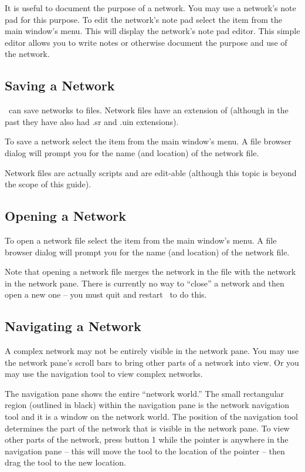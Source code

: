 It is useful to document the purpose of a network.  You may use a network's
note pad for this purpose.  To edit the network's note pad select the
 item from the main window's  menu.  This
will display the network's note pad editor.  This simple editor allows you
to write notes or otherwise document the purpose and use of the network.


\subsection{Saving a Network}
\label{sec:savenet}

\sr\ can save networks to files.  Network files have an extension of
 (although in the past they have also had .sr and .uin
extensions).  

To save a network select the  item from the main window's
 menu.  A file browser dialog will prompt you for the
name (and location) of the network file.

Network files are actually  scripts and
are edit-able (although this topic is beyond the scope of this guide).

\subsection{Opening a Network}
\label{sec:opennet}

To open a network file select the  item from the main
window's  menu.   A file browser dialog will prompt you for the
name (and location) of the network file.

Note that opening a network file merges the network in the file with the
network in the network pane.  There is currently no way to ``close'' a
network and then open a new one -- you must quit and restart \sr\ to do
this.

\subsection{Navigating a Network}
\label{sec:navnetwork}

A complex network may not be entirely visible in the network pane.  You may
use the network pane's scroll bars to bring other parts of a network into
view.  Or you may use the navigation tool to view complex networks.

The navigation pane shows the entire ``network world.''  The small
rectangular region (outlined in black) within the navigation pane is the
network navigation tool and it is a window on the network world.  The
position of the navigation tool determines the part of the network that is
visible in the network pane.  To view other parts of the network, press
button 1 while the pointer is anywhere in the navigation pane -- this will
move the tool to the location of the pointer --  then drag the tool to the
new location.


